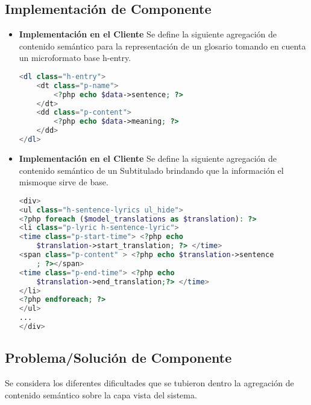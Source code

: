 \begin{minipage}{1.0\textwidth}
	\centering
	\label{fig:Presentaci\'{o}n Subtitulado}
\end{minipage}

\subsection{Implementaci\'{o}n de Componente}

\begin{itemize}

\item \textbf{Implementaci\'{o}n en el Cliente}
Se define la siguiente agregaci\'{o}n de contenido sem\'{a}ntico para la 
representaci\'{o}n de un glosario tomando en cuenta un microformato base h-entry.

\begin{lstlisting}[language = PHP]
<dl class="h-entry">
    <dt class="p-name">
        <?php echo $data->sentence; ?> 
    </dt> 
    <dd class="p-content">
        <?php echo $data->meaning; ?> 
    </dd>
</dl>
\end{lstlisting}

\item \textbf{Implementaci\'{o}n en el Cliente}
Se define la siguiente agregaci\'{o}n de contenido sem\'{a}ntico de un Subtitulado
brindando que la informaci\'{o}n el mismoque sirve de base.

\begin{lstlisting}[language = PHP]
<div>
<ul class="h-sentence-lyrics ul_hide">
<?php foreach ($model_translations as $translation): ?>  
<li class="p-lyric h-sentence-lyric"> 
<time class="p-start-time"> <?php echo 
    $translation->start_translation; ?> </time>    
<span class="p-content" > <?php echo $translation->sentence
    ; ?></span>
<time class="p-end-time"> <?php echo 
    $translation->end_translation;?> </time>
</li>
<?php endforeach; ?>
</ul>
...
</div>
\end{lstlisting}

\end{itemize}

\subsection{Problema/Soluci\'{o}n de Componente}

Se considera los diferentes dificultades que se tubieron dentro la agregaci\'{o}n
de contenido sem\'{a}ntico sobre la capa vista del sistema.

